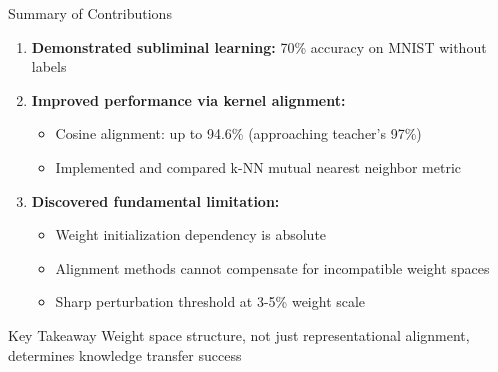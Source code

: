 \documentclass{beamer}
\begin{document}
\begin{frame}{Summary of Contributions}

\begin{enumerate}
    \item \textbf{Demonstrated subliminal learning:} 70\% accuracy on MNIST without labels

    \vspace{0.5em}

    \item \textbf{Improved performance via kernel alignment:}
    \begin{itemize}
        \item Cosine alignment: up to 94.6\% (approaching teacher's 97\%)
        \item Implemented and compared k-NN mutual nearest neighbor metric
    \end{itemize}

    \vspace{0.5em}

    \item \textbf{Discovered fundamental limitation:}
    \begin{itemize}
        \item Weight initialization dependency is absolute
        \item Alignment methods cannot compensate for incompatible weight spaces
        \item Sharp perturbation threshold at 3-5\% weight scale
    \end{itemize}
\end{enumerate}

\vspace{1em}

\begin{alertblock}{Key Takeaway}
Weight space structure, not just representational alignment, determines knowledge transfer success
\end{alertblock}

\end{frame}
\end{document}
